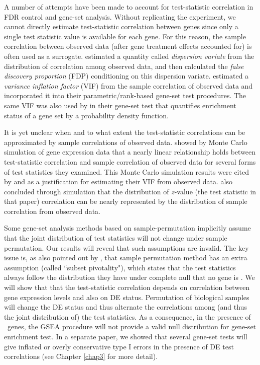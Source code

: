 A number of attempts have been made to account for test-statistic
correlation in FDR control and gene-set analysis. 
Without replicating the experiment, we cannot directly estimate test-statistic
correlation between genes since only a single test statistic value is 
available for each gene. For this reason, the sample correlation
between observed data (after gene 
treatment effects accounted for) is often used as a surrogate.
\citet{efron2007correlation} estimated a quantity called \textit{dispersion variate} from the 
distribution 
of correlation among observed data, and then calculated the \textit{false discovery proportion} 
(FDP) conditioning on this dispersion variate. \citet{wu2012camera} estimated a \textit{variance 
	inflation factor} (VIF) from the sample correlation of observed data and 
incorporated it into their parametric/rank-based gene-set test procedures. The same VIF was also 
used by \citet{yaari2013quantitative} in their gene-set test that quantifies enrichment status of a 
gene set by a probability density function. 

It is yet unclear when and to what extent the test-statistic correlations can be approximated 
by sample correlations of observed data. \citet{barry2008statistical} showed by Monte Carlo 
simulation of gene expression data that a nearly linear relationship holds between test-statistic 
correlation and sample correlation of observed data for
several forms of test statistics they examined. This Monte Carlo
simulation results were cited by \citet{wu2012camera} and
\citet{yaari2013quantitative} as a justification for estimating their
VIF from observed data. \citet{efron2007correlation} also concluded
through simulation that the distribution of $z$-value (the test
statistic in that paper) correlation can be nearly represented by the
distribution of sample correlation from observed data. 	


Some gene-set analysis methods based on sample-permutation implicitly
assume that the joint distribution of test statistics will not change
under sample permutation. Our results will reveal that such assumptions
are invalid. The key issue is, as also pointed out by  \citet{efron2012large1}, that sample 
permutation method has an extra assumption (called ``subset pivotality"), which states that the 
test statistics always follow the distribution they have under complete null that no gene is \DED.
We will show that that the test-statistic correlation depends on
correlation between gene expression levels and also on DE status.
Permutation of biological samples will change the DE status and thus
alternate the correlations among  (and thus the joint distribution of) the
test statistics. As a consequence, in the presence of \DED~genes, the
GSEA \citep{subramanian2005gene} procedure will not provide a valid null distribution for 
gene-set enrichment test. In a separate paper, we showed that several
gene-set tests will give inflated or overly conservative type I errors in the presence of DE test
correlations (see Chapter \ref{chap3} for more detail).

